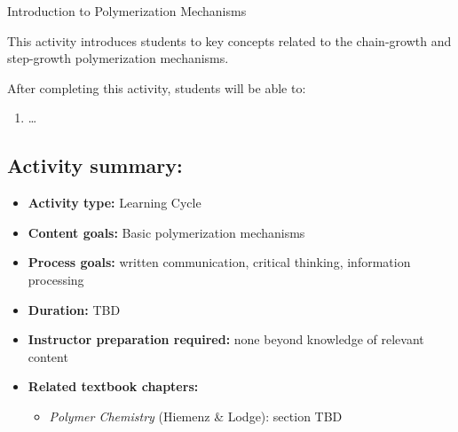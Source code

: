 %
%
%
%

\renewcommand{\figpath}{content/intro/chain-and-step/figs}
\renewcommand{\labelbase}{chain-and-step}

\begin{activity}{Introduction to Polymerization Mechanisms}
\begin{instructornotes}

	This activity introduces students to key concepts related to the chain-growth and step-growth polymerization mechanisms.
	
	After completing this activity, students will be able to:
			\begin{enumerate}
				\item \dots
			\end{enumerate}
			
	\subsection*{Activity summary:}
	\begin{itemize}
		\item \textbf{Activity type:} Learning Cycle
		\item \textbf{Content goals:} Basic polymerization mechanisms
		\item \textbf{Process goals:} %
			written communication, critical thinking, information processing
		\item \textbf{Duration:} TBD
		\item \textbf{Instructor preparation required:} none beyond knowledge of relevant content
		\item \textbf{Related textbook chapters:}
			\begin{itemize}
				\item \emph{Polymer Chemistry} (Hiemenz \& Lodge): section TBD%
			\end{itemize}
	\end{itemize}


\end{instructornotes}
\end{activity}
